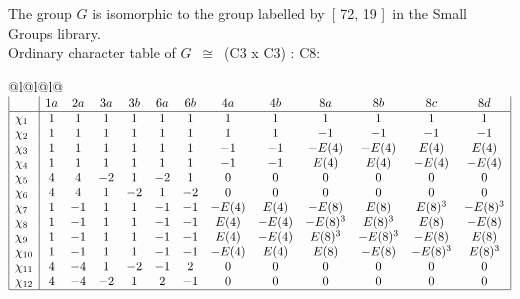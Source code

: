 \documentclass[varwidth=\maxdimen,border=10]{standalone}
\begin{document}
The group $G$ is isomorphic to the group labelled by\ [ 72, 19 ]\ in the Small Groups library.\\
Ordinary character table of $G$\ $\cong$\ (C3 x C3) : C8:\\
\begin{center}
\begin{tabular}{@{}l@{}l@{}l@{}}
\hline
\(\begin{array}{|l|cccccccccccc|}
  & 1a & 2a & 3a & 3b & 6a & 6b & 4a & 4b & 8a & 8b & 8c & 8d\\ \hline
\chi_{1} & 1 & 1 & 1 & 1 & 1 & 1 & 1 & 1 & 1 & 1 & 1 & 1\\
\chi_{2} & 1 & 1 & 1 & 1 & 1 & 1 & 1 & 1 & -1 & -1 & -1 & -1\\
\chi_{3} & 1 & 1 & 1 & 1 & 1 & 1 & -1 & -1 & -E(4) & -E(4) & E(4) & E(4)\\
\chi_{4} & 1 & 1 & 1 & 1 & 1 & 1 & -1 & -1 & E(4) & E(4) & -E(4) & -E(4)\\
\chi_{5} & 4 & 4 & -2 & 1 & -2 & 1 & 0 & 0 & 0 & 0 & 0 & 0\\
\chi_{6} & 4 & 4 & 1 & -2 & 1 & -2 & 0 & 0 & 0 & 0 & 0 & 0\\
\chi_{7} & 1 & -1 & 1 & 1 & -1 & -1 & -E(4) & E(4) & -E(8) & E(8) & E(8)^{3} & -E(8)^{3}\\
\chi_{8} & 1 & -1 & 1 & 1 & -1 & -1 & E(4) & -E(4) & -E(8)^{3} & E(8)^{3} & E(8) & -E(8)\\
\chi_{9} & 1 & -1 & 1 & 1 & -1 & -1 & E(4) & -E(4) & E(8)^{3} & -E(8)^{3} & -E(8) & E(8)\\
\chi_{10} & 1 & -1 & 1 & 1 & -1 & -1 & -E(4) & E(4) & E(8) & -E(8) & -E(8)^{3} & E(8)^{3}\\
\chi_{11} & 4 & -4 & 1 & -2 & -1 & 2 & 0 & 0 & 0 & 0 & 0 & 0\\
\chi_{12} & 4 & -4 & -2 & 1 & 2 & -1 & 0 & 0 & 0 & 0 & 0 & 0\\
\hline
\end{array}\)\\
\end{tabular}
\end{center}
\end{document}
